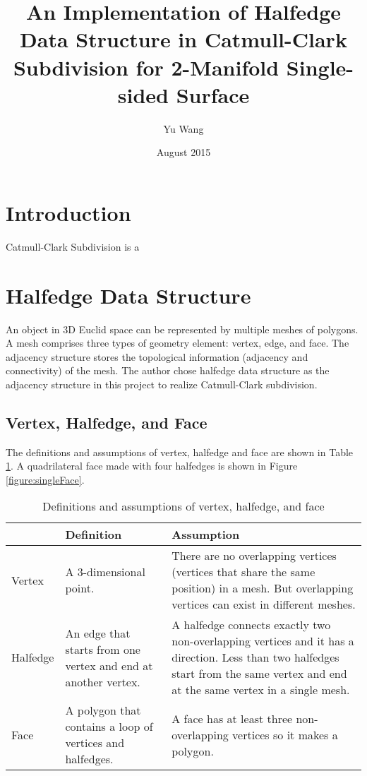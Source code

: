 \documentclass[12pt]{article}
\title{An Implementation of Halfedge Data Structure in Catmull-Clark 
Subdivision for 2-Manifold Single-sided Surface}
\author{Yu Wang}
\date{August 2015}
\begin{document}
\maketitle
\newpage


\section{Introduction}
Catmull-Clark Subdivision is a 
\section{Halfedge Data Structure} \label{sec:halfedge}

An object in 3D Euclid space can be represented by multiple meshes of polygons. 
A mesh comprises three types of geometry element: vertex, edge, and face. 
The adjacency structure stores the topological information (adjacency and 
connectivity) of the mesh. The author chose halfedge data structure as the 
adjacency structure in this project to realize Catmull-Clark subdivision.

\subsection{Vertex, Halfedge, and Face}

The definitions and assumptions of vertex, halfedge and face are shown 
in Table \ref{table:vhfdef}. A quadrilateral face made with four halfedges 
is shown in Figure \ref{figure:singleFace}. 

\begin{table}[h]
\centering
\begin{tabular}{| l | p{} | p{}|}

\hline
		&	Definition	& Assumption	\\
\hline
Vertex	&	A 3-dimensional point.		&	There are no overlapping vertices 
(vertices that share the same position) in a mesh. But overlapping vertices
 can exist in different meshes.		\\
\hline
Halfedge	&	An edge that starts from one vertex and end at another vertex. & 
A halfedge connects exactly two non-overlapping vertices and it has a direction. 
Less than two halfedges start from the same vertex and end at the same vertex in a 
single mesh.\\
\hline
Face		&	A polygon that contains a loop of vertices and halfedges.	& A face has at 
least three non-overlapping vertices so it makes a polygon.\\
\hline
\end{tabular}
\caption{Definitions and assumptions of vertex, halfedge, and face} 
\label{table:vhfdef}
\end{table}
\end{document}
